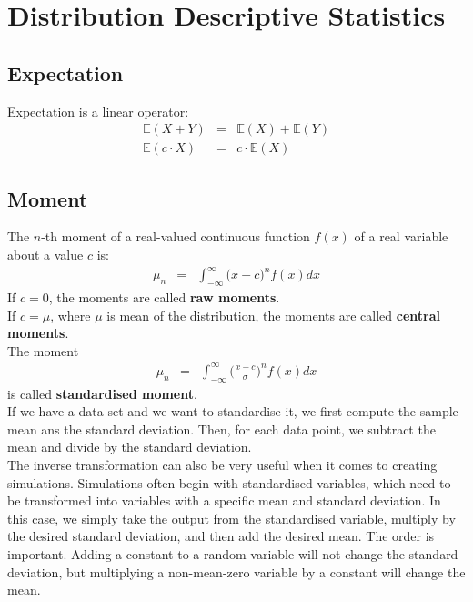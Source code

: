 \chapter{Distribution Descriptive Statistics}

\section{Expectation}
Expectation is a linear operator:
\begin{eqnarray}
	\mathbb{E}(X + Y) &=& \mathbb{E}(X) + \mathbb{E}(Y)\\
	\mathbb{E}(c\cdot X) &=& c\cdot\mathbb{E}(X)
\end{eqnarray}

\section{Moment}
The $n$-th moment of a real-valued continuous function $f(x)$ of a real variable about a value $c$ is:
\begin{eqnarray}
	\mu_{n} &=& \int_{-\infty}^{\infty}\Big(x - c\Big)^{n}f(x)dx
\end{eqnarray}
If $c = 0$, the moments are called \textbf{\color{blue}raw moments}.\\
If $c = \mu$, where $\mu$ is mean of the distribution, the moments are called \textbf{\color{blue}central moments}.\\
The moment
\begin{eqnarray}
\mu_{n} &=& \int_{-\infty}^{\infty}\Bigg(\frac{x - c}{\sigma}\Bigg)^{n}f(x)dx
\end{eqnarray}
is called \textbf{\color{blue}standardised moment}.\\
If we have a data set and we want to standardise it, we first compute the sample mean ans the standard deviation. Then, for each data point, we subtract the mean and divide by the standard deviation.\\
The inverse transformation can also be very useful when it comes to creating simulations. Simulations often begin with standardised variables, which need to be transformed into variables with a specific mean and standard deviation. In this case, we simply take the output from the standardised variable, multiply by the desired standard deviation, and then add the desired mean. The order is important. Adding a constant to a random variable will not change the standard deviation, but multiplying a non-mean-zero variable by a constant will change the mean.



